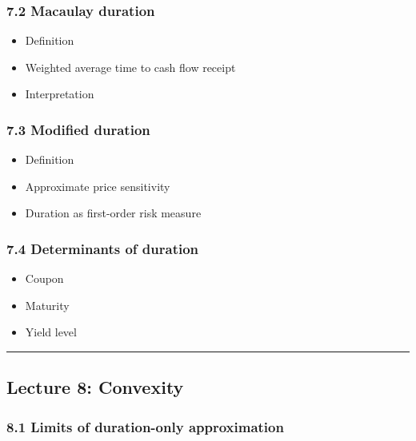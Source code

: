 \documentclass[
  letterpaper,
  DIV=11,
  numbers=noendperiod]{scrartcl}
\providecommand{\tightlist}{%
  \setlength{\itemsep}{0pt}\setlength{\parskip}{0pt}}
\begin{document}
\subsubsection{7.2 Macaulay duration}\label{macaulay-duration}

\begin{itemize}
\tightlist
\item
  Definition
\item
  Weighted average time to cash flow receipt
\item
  Interpretation
\end{itemize}

\subsubsection{7.3 Modified duration}\label{modified-duration}

\begin{itemize}
\tightlist
\item
  Definition
\item
  Approximate price sensitivity
\item
  Duration as first-order risk measure
\end{itemize}

\subsubsection{7.4 Determinants of
duration}\label{determinants-of-duration}

\begin{itemize}
\tightlist
\item
  Coupon
\item
  Maturity
\item
  Yield level
\end{itemize}

\begin{center}\rule{0.5\linewidth}{0.5pt}\end{center}

\subsection{Lecture 8: Convexity}\label{lecture-8-convexity}

\subsubsection{8.1 Limits of duration-only
approximation}\label{limits-of-duration-only-approximation}
\end{document}
